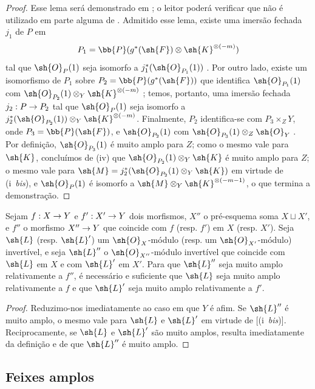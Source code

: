 \documentclass[oneside,10pt]{amsart}
\makeatletter
\newcommand{\ega@arrow}[2]{\mathchoice{#1}{#2}{#2}{#2}}
\renewcommand{\to}{\ega@arrow{\longrightarrow}{\rightarrow}}
\newcommand{\oldpage}[2][]{\marginnote{\normalfont\footnotesize\textbf{#1}~|~#2}\ignorespaces}
\let\EGAOriginalLabel\label
\renewcommand{\label}[1]{\phantomsection\EGAOriginalLabel{#1}}
\makeatother
\begin{document}
\begin{proof}
Esse lema será demonstrado em ;
o leitor poderá verificar que  não é utilizado em parte alguma de .
\oldpage[II]{83}
Admitido esse lema, existe uma imersão fechada $j_1$ de $P$ em
\[
  P_1=\bb{P}(g^*(\sh{F})\otimes\sh{K}^{\otimes(-m)})
\]
tal que $\sh{O}_P(1)$ seja isomorfo a $j_1^*(\sh{O}_{P_1}(1))$ .
Por outro lado, existe um isomorfismo de $P_1$ sobre $P_2=\bb{P}(g^*(\sh{F}))$ que identifica $\sh{O}_{P_1}(1)$ com $\sh{O}_{P_2}(1)\otimes_Y\sh{K}^{\otimes(-m)}$ ;
temos, portanto, uma imersão fechada $j_2:P\to P_2$ tal que $\sh{O}_P(1)$ seja isomorfo a $j_2^*(\sh{O}_{P_2}(1))\otimes_Y\sh{K}^{\otimes(-m)}$.
Finalmente, $P_2$ identifica-se com $P_3\times_Z Y$, onde $P_3=\bb{P}(\sh{F})$, e $\sh{O}_{P_2}(1)$ com $\sh{O}_{P_3}(1)\otimes_Z\sh{O}_Y$ .
Por definição, $\sh{O}_{P_3}(1)$ é muito amplo para $Z$;
como o mesmo vale para $\sh{K}$, concluímos de (iv) que $\sh{O}_{P_2}(1)\otimes_Y\sh{K}$ é muito amplo para $Z$;
o mesmo vale para $\sh{M}=j_2^*(\sh{O}_{P_2}(1)\otimes_Y\sh{K})$ em virtude de (i~\emph{bis}), e $\sh{O}_P(1)$ é isomorfo a $\sh{M}\otimes_Y\sh{K}^{\otimes(-m-1)}$, o que termina a demonstração.
\end{proof}

\begin{proposition}[4.4.11]
\label{II.4.4.11}
Sejam $f:X\to Y$ e $f':X'\to Y$ dois morfismos, $X''$ o pré-esquema soma $X\sqcup X'$, e $f''$ o morfismo $X''\to Y$ que coincide com $f$ (resp. $f'$) em $X$ (resp. $X'$).
Seja $\sh{L}$ (resp. $\sh{L}'$) um $\sh{O}_X$-módulo (resp. um $\sh{O}_{X'}$-módulo) invertível, e seja $\sh{L}''$ o $\sh{O}_{X''}$-módulo invertível que coincide com $\sh{L}$ em $X$ e com $\sh{L}'$ em $X'$.
Para que $\sh{L}''$ seja muito amplo relativamente a $f''$, é necessário e suficiente que $\sh{L}$ seja muito amplo relativamente a $f$ e que $\sh{L}'$ seja muito amplo relativamente a $f'$.
\end{proposition}

\begin{proof}
Reduzimo-nos imediatamente ao caso em que $Y$ é afim.
Se $\sh{L}''$ é muito amplo, o mesmo vale para $\sh{L}$ e $\sh{L}'$ em virtude de [(i~\emph{bis})].
Reciprocamente, se $\sh{L}$ e $\sh{L}'$ são muito amplos, resulta imediatamente da definição  e de  que $\sh{L}''$ é muito amplo.
\end{proof}

\subsection{Feixes amplos}
\label{subsection:II.4.5}
\end{document}
